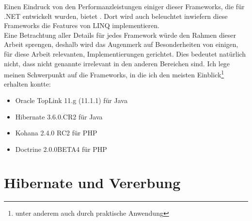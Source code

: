 Einen Eindruck von den Performanzleistungen einiger dieser Frameworks, die für .NET entwickelt wurden, bietet \cite{ormeter.net}. Dort wird auch beleuchtet inwiefern diese Frameworks die Features von LINQ implementieren.\\
Eine Betrachtung aller Details für jedes Framework würde den Rahmen dieser Arbeit sprengen, deshalb wird das Augenmerk auf Besonderheiten von einigen, für diese Arbeit relevanten, Implementierungen gerichtet. Dies bedeutet natürlich nicht, dass nicht genannte irrelevant in den anderen Bereichen sind. Ich lege meinen Schwerpunkt auf die Frameworks, in die ich den meisten Einblick\footnote{unter anderem auch durch praktische Anwendung} erhalten kontte:\\
\begin{itemize}
\item Oracle TopLink 11.g (11.1.1) für Java \cite{toplink-documentation}
\item Hibernate 3.6.0.CR2 für Java \cite{hibernate-documentation}
\item Kohana 2.4.0 RC2 für PHP \cite{kohana-documentation}
\item Doctrine 2.0.0BETA4 für PHP \cite{doctrine-documentation}
\end{itemize}

\section{Hibernate und Vererbung}

